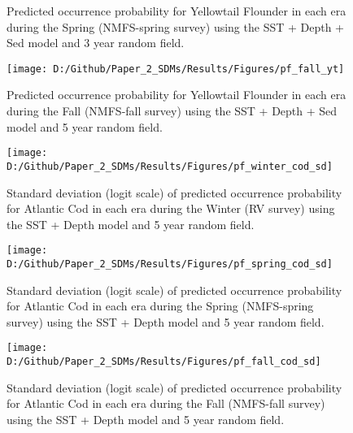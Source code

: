 \documentclass[
]{article}
\begin{document}
\begin{landscape}
\begin{figure}[htb]
\caption{Predicted occurrence probability for Yellowtail Flounder in each era during the Spring (NMFS-spring survey) using the SST + Depth + Sed  model and 3 year random field.}\label{fig:pf-spring-yt}
\end{figure}

\newpage
\begin{figure}[htb]

{\centering \texttt{[image: D:/Github/Paper\_2\_SDMs/Results/Figures/pf\_fall\_yt]} 

}

\caption{Predicted occurrence probability for Yellowtail Flounder in each era during the Fall (NMFS-fall survey) using the SST + Depth + Sed model and 5 year random field.}\label{fig:pf-fall-yt}
\end{figure}

\newpage

\begin{figure}[htb]

{\centering \texttt{[image: D:/Github/Paper\_2\_SDMs/Results/Figures/pf\_winter\_cod\_sd]} 

}

\caption{Standard deviation (logit scale) of predicted occurrence probability for Atlantic Cod  in each era during the Winter (RV survey) using the SST + Depth model and 5 year random field.}\label{fig:pf-winter-cod-sd}
\end{figure}

\newpage
\begin{figure}[htb]

{\centering \texttt{[image: D:/Github/Paper\_2\_SDMs/Results/Figures/pf\_spring\_cod\_sd]} 

}

\caption{Standard deviation (logit scale) of predicted occurrence probability for Atlantic Cod  in each era during the Spring (NMFS-spring survey) using the SST + Depth model and 5 year random field.}\label{fig:pf-spring-cod-sd}
\end{figure}

\newpage
\begin{figure}[htb]

{\centering \texttt{[image: D:/Github/Paper\_2\_SDMs/Results/Figures/pf\_fall\_cod\_sd]} 

}

\caption{Standard deviation (logit scale) of predicted occurrence probability for Atlantic Cod  in each era during the Fall (NMFS-fall survey) using the SST + Depth model and 5 year random field.}\label{fig:pf-fall-cod-sd}
\end{figure}


\end{landscape}
\end{document}
